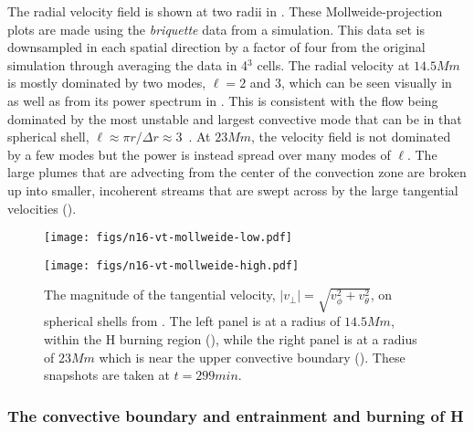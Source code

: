 \documentclass[fleqn,usenatbib]{mnras}
\newcommand{\ppmstar}{\code{PPMstar}}
\begin{document}
The radial velocity field is shown at two radii in . These
Mollweide-projection plots are made using the \textit{briquette} data from a
\ppmstar{} simulation. This data set is downsampled in each spatial direction by
a factor of four from the original simulation through averaging the data in
4$^{3}$ cells. The radial velocity at $\unit{14.5}{Mm}$ is mostly dominated by
two modes, $\ell = 2$ and $3$, which can be seen visually in  as
well as from its power spectrum in . This is
consistent with the flow being dominated by the most unstable and largest
convective mode that can be in that spherical shell, $\ell \approx \pi r /
\Delta r \approx 3$~\citep{chandrabook1961}. At $\unit{23}{Mm}$, the velocity
field is not dominated by a few modes but the power is instead spread over many
modes of $\ell$. The large plumes that are advecting from the center of the
convection zone are broken up into smaller, incoherent streams that are swept
across by the large tangential velocities ().

\begin{figure*}

  \begin{minipage}{.49\textwidth}
    \centering
    \texttt{[image: figs/n16-vt-mollweide-low.pdf]}
  \end{minipage}
  \begin{minipage}{.49\textwidth}
    \centering
    \texttt{[image: figs/n16-vt-mollweide-high.pdf]}
  \end{minipage}
  \caption{The magnitude of the tangential velocity, $|v_{\perp}| =
          \sqrt{v_{\phi}^{2} + v_{\theta}^{2}}$, on spherical shells from .
          The left panel is at a radius of $\unit{14.5}{Mm}$, within the H burning region
          (), while the right panel is at a radius of $\unit{23}{Mm}$
          which is near the upper convective boundary (). These
          snapshots are taken at $t = \unit{299}{min}$.}
  \label{fig:vt-mollweide}

\end{figure*}


\subsubsection{The convective boundary and entrainment and burning of H}
\label{sec:convbound}
\end{document}
